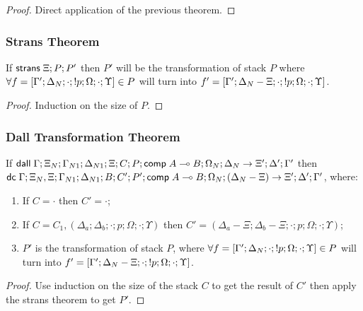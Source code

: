 \begin{proof}
   Direct application of the previous theorem.
\end{proof}

\subsubsection{Strans Theorem}

\begin{theorem}
   If $\mathsf{strans} \; \Xi; P; P'$ then $P'$ will be the transformation of stack $P$ where $\forall f = [\Gamma'; \Delta_N; \cdot; {!} p; \Omega; \cdot; \Upsilon] \in P$ will turn into $f' = [\Gamma'; \Delta_N - \Xi; \cdot; {!} p; \Omega; \cdot; \Upsilon]$.
\end{theorem}

\begin{proof}
   Induction on the size of $P$.
\end{proof}

\subsubsection{Dall Transformation Theorem}

\begin{theorem}
   If $\mathsf{dall} \; \Gamma; \Xi_N; \Gamma_{N1}; \Delta_{N1}; \Xi; C; P; \mathsf{comp} \; A \multimap B; \Omega_N; \Delta_N \rightarrow \Xi'; \Delta'; \Gamma'$ then $\mathsf{dc} \; \Gamma; \Xi_N, \Xi; \Gamma_{N1}; \Delta_{N1}; B; C' ; P'; \mathsf{comp} \; A \multimap B; \Omega_N; (\Delta_N - \Xi) \rightarrow \Xi'; \Delta'; \Gamma'$, where:
   
   \begin{enumerate}
      \item If $C = \cdot$ then $C' = \cdot$;
      \item If $C = C_1, (\Delta_a; \Delta_b; \cdot; p; \Omega; \cdot; \Upsilon)$ then $C' = (\Delta_a - \Xi; \Delta_b - \Xi; \cdot; p; \Omega; \cdot; \Upsilon)$;
      \item $P'$ is the transformation of stack $P$, where $\forall f = [\Gamma'; \Delta_N; \cdot; {!} p; \Omega; \cdot; \Upsilon] \in P$ will turn into $f' = [\Gamma'; \Delta_N - \Xi; \cdot; {!} p; \Omega; \cdot; \Upsilon]$.
   \end{enumerate}
\end{theorem}

\begin{proof}
   Use induction on the size of the stack $C$ to get the result of $C'$ then apply the strans theorem to get $P'$.
\end{proof}


